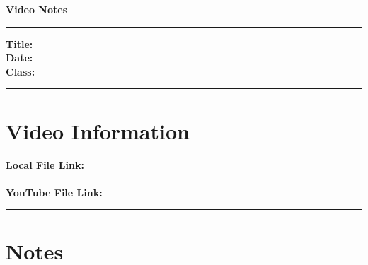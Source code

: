 \documentclass[10pt]{article}
\theoremstyle{definition}
\begin{document}
\begin{center}
\textbf{\Large Video Notes}
\end{center}

\bigskip
\hrule
\textbf{Title:} \\
\textbf{Date:} \\
\textbf{Class:} \\
\hrule
\bigskip


\section*{Video Information}
\textbf{Local File Link:} \\
\href{file:///}{} \\
\textbf{YouTube File Link:} \\
\href{}{}

\bigskip
\hrule
\bigskip

\section*{Notes}
\end{document}
